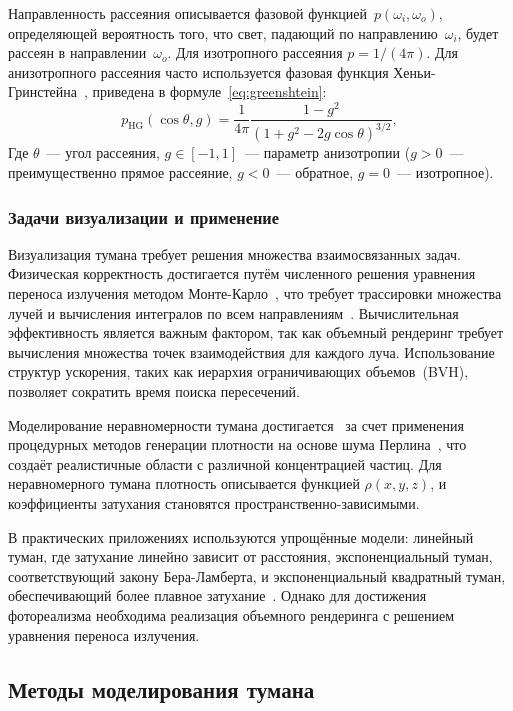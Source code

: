 Направленность рассеяния описывается фазовой функцией~$p(\omega_i, \omega_o)$, определяющей вероятность того, что свет, падающий по направлению~$\omega_i$, будет рассеян в направлении~$\omega_o$. Для изотропного рассеяния $p = 1/(4\pi)$.
Для анизотропного рассеяния часто используется фазовая функция Хеньи-Гринстейна~\cite{gpu-monte-carlo}, приведена в формуле~\ref{eq:greenshtein}:
\begin{equation}
    \label{eq:greenshtein}
    p_{\text{HG}}(\cos\theta, g) = \frac{1}{4\pi} \frac{1 - g^2}{(1 + g^2 - 2g\cos\theta)^{3/2}},    
\end{equation}
Где $\theta$~--- угол рассеяния, $g \in [-1, 1]$~--- параметр анизотропии ($g > 0$~--- преимущественно прямое рассеяние, $g < 0$~--- обратное, $g = 0$~--- изотропное).

\subsubsection{Задачи визуализации и применение}

Визуализация тумана требует решения множества взаимосвязанных задач.
Физическая корректность достигается путём численного решения уравнения переноса излучения методом Монте-Карло~\cite{monte-carlo}, что требует трассировки множества лучей и вычисления интегралов по всем направлениям~\cite{rte-pbr}.
Вычислительная эффективность является важным фактором, так как объемный рендеринг требует вычисления множества точек взаимодействия для каждого луча. Использование структур ускорения, таких как иерархия ограничивающих объемов~(BVH), позволяет сократить время поиска пересечений.

Моделирование неравномерности тумана достигается~\cite{fog-article} за счет применения процедурных методов генерации плотности на основе шума Перлина~\cite{perlin-noise},
что создаёт реалистичные области с различной концентрацией частиц. Для неравномерного тумана плотность описывается функцией $\rho(x, y, z)$, и коэффициенты затухания становятся пространственно-зависимыми.

В практических приложениях используются упрощённые модели: линейный туман, где затухание линейно зависит от расстояния,
экспоненциальный туман, соответствующий закону Бера-Ламберта,
и экспоненциальный квадратный туман, обеспечивающий более плавное затухание~\cite{fog-article}.
Однако для достижения фотореализма необходима реализация объемного рендеринга с решением уравнения переноса излучения.

\subsection{Методы моделирования тумана}
